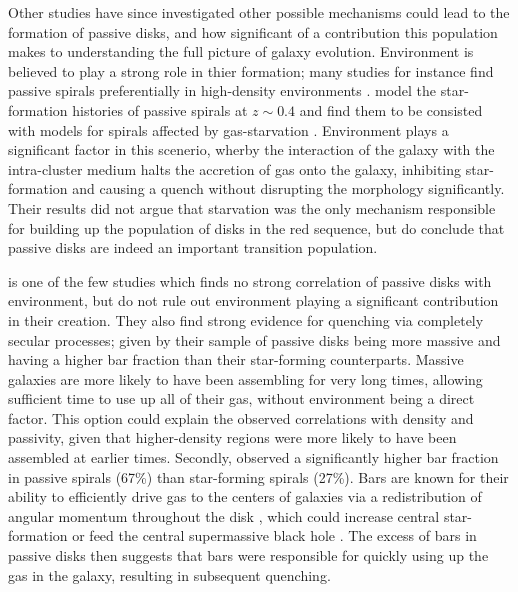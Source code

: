 \documentclass[useAMS,usenatbib]{mn2e}
\begin{document}
Other studies have since investigated other possible mechanisms could lead to the formation of passive disks, and how significant of a contribution this population makes to understanding the full picture of galaxy evolution. Environment is believed to play a strong role in thier formation; many studies for instance find passive spirals preferentially in high-density environments \citep{Dressler1999, Poggianti1999, Goto2003, Deng2009, Hughes2009}. \citet{Moran2006} model the star-formation histories of passive spirals at $z\sim0.4$ and find them to be consisted with models for spirals affected by gas-starvation \citep{Larson1980, Quilis2000, Bekki2002}. Environment plays a significant factor in this scenerio, wherby the interaction of the galaxy with the intra-cluster medium halts the accretion of gas onto the galaxy, inhibiting star-formation and causing a quench without disrupting the morphology significantly. Their results did not argue that starvation was the only mechanism responsible for building up the population of disks in the red sequence, but do conclude that passive disks are indeed an important transition population.

\citet{Masters2010} is one of the few studies which finds no strong correlation of passive disks with environment, but do not rule out environment playing a significant contribution in their creation. They also find strong evidence for quenching via completely secular processes; given by their sample of passive disks being more massive and having a higher bar fraction than their star-forming counterparts. Massive galaxies are more likely to have been assembling for very long times, allowing sufficient time to use up all of their gas, without environment being a direct factor. This option could explain the observed correlations with density and passivity, given that higher-density regions were more likely to have been assembled at earlier times. Secondly, \citet{Masters2010} observed a significantly higher bar fraction in passive spirals (67\%) than star-forming spirals (27\%). Bars are known for their ability to efficiently drive gas to the centers of galaxies via a redistribution of angular momentum throughout the disk \citep{Sellwood1993,Shlosman1989,Ann2005}, which could increase central star-formation \citep{Hawarden1986,Ho1997} or feed the central supermassive black hole \citep{Athanassoula1992,Friedli1993}. The excess of bars in passive disks then suggests that bars were responsible for quickly using up the gas in the galaxy, resulting in subsequent quenching. 
\end{document}
